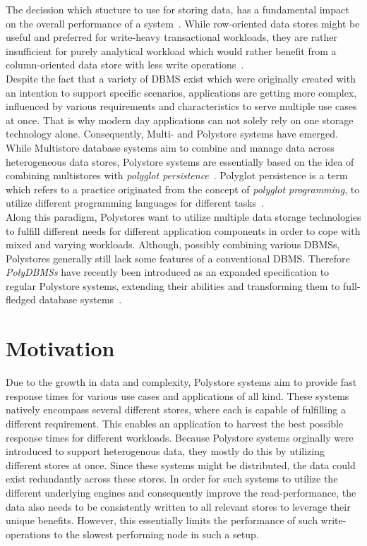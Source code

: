 The decission which stucture to use for storing data, has a fundamental impact on the overall performance of a system~\cite{plattner2015}.
While row-oriented data stores might be useful and preferred for write-heavy transactional 
workloads, they are rather insufficient for purely analytical workload which would rather benefit from a
column-oriented data store with less write operations~\cite{sigmond2008}.\\
Despite the fact that a variety of DBMS exist which were originally created with an intention to support specific scenarios,
applications are getting more complex, influenced by various requirements and characteristics to serve multiple use cases at once.
That is why modern day applications can not solely rely on one storage technology alone. 
Consequently, Multi- and Polystore systems have emerged.
While Multistore database systems aim to combine and manage data across heterogeneous data stores,
Polystore systems are essentially based on the idea of combining multistores with
\textit{polyglot persistence}~\cite{polypheny2020}.
Polyglot persistence is a term which refers to a practice originated from the concept 
of \textit{polyglot programming}, to utilize different 
programming languages for different tasks~\cite{fowler2011}. \\
Along this paradigm, Polystores want to utilize multiple data storage technologies to
fulfill different needs for different application components in order to cope
with mixed and varying workloads.
Although, possibly combining various DBMSs, Polystores generally still lack some features of a conventional DBMS.
Therefore \emph{PolyDBMSs} have recently been introduced as an expanded specification to 
regular Polystore systems, extending their abilities and transforming them to full-fledged database systems~\cite{polypheny2021}.


\section{Motivation}

Due to the growth in data and complexity, Polystore systems aim to provide fast response times for various use cases and applications of all kind.
These systems natively encompass several different stores, where each is capable of fulfilling a different requirement. 
This enables an application to harvest the best possible response times for different workloads.
Because Polystore systems orginally were introduced to support heterogenous data, they mostly do this by utilizing different stores at once.
Since these systems might be distributed, the data could exist redundantly across these stores. 
In order for such systems to utilize the different underlying engines and consequently improve the read-performance, 
the data also needs to be consistently written to all relevant stores to leverage their unique benefits.
However, this essentially limits the performance of such write-operations to the slowest performing node in such a setup.

